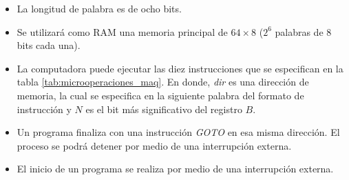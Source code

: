 \documentclass{article}
\begin{document}
\begin{itemize}
  \item
    La longitud de palabra es de ocho bits.
  
  \item
    Se utilizará como RAM una memoria principal de $64 \times 8$ ($2^6$ palabras de $8$ bits cada una).

  \item  
    La computadora puede ejecutar las diez instrucciones que se especifican en la tabla \ref{tab:microoperaciones_maq}. En donde, \textit{dir} es una dirección de memoria, la cual se especifica en la siguiente palabra del formato de instrucción y $N$ es el bit más significativo del registro $B$.

  \item
    Un programa finaliza con una instrucción \textit{GOTO} en esa misma dirección.  El proceso se podrá detener por medio de una interrupción externa.
  
  \item
    El inicio de un programa se realiza por medio de una interrupción externa.

\end{itemize}
\end{document}
